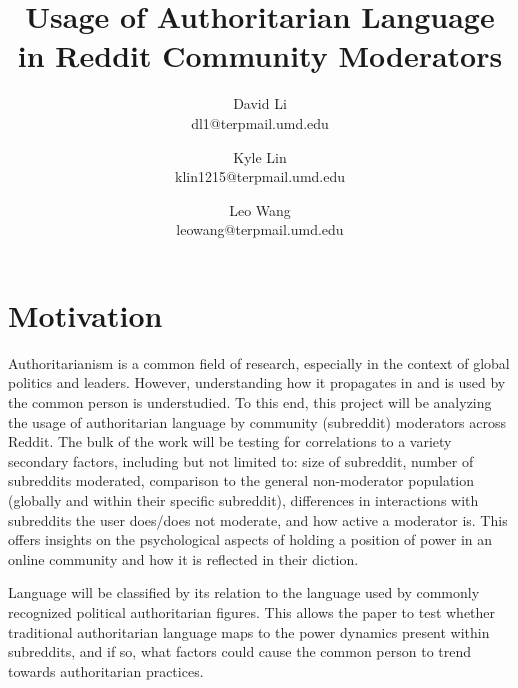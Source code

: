 \documentclass[letterpaper,twocolumn,10pt]{article}
\begin{document}

\date{}

\title{\Large \bf Usage of Authoritarian Language in Reddit Community Moderators}

\author{ %
{\rm David Li}\\
dl1@terpmail.umd.edu
\and
{\rm Kyle Lin}\\
klin1215@terpmail.umd.edu
\and
{\rm Leo Wang}\\
leowang@terpmail.umd.edu
}

\maketitle

\section{Motivation}


Authoritarianism is a common field of research, especially in the context of global politics and leaders. However, understanding how it propagates in and is used by the common person is understudied. To this end, this project will be analyzing the usage of authoritarian language by community (subreddit) moderators across Reddit. The bulk of the work will be testing for correlations to a variety secondary factors, including but not limited to: size of subreddit, number of subreddits moderated, comparison to the general non-moderator population (globally and within their specific subreddit), differences in interactions with subreddits the user does/does not moderate, and how active a moderator is. This offers insights on the psychological aspects of holding a position of power in an online community and how it is reflected in their diction.

Language will be classified by its relation to the language used by commonly recognized political authoritarian figures. This allows the paper to test whether traditional authoritarian language maps to the power dynamics present within subreddits, and if so, what factors could cause the common person to trend towards authoritarian practices.
\end{document}
